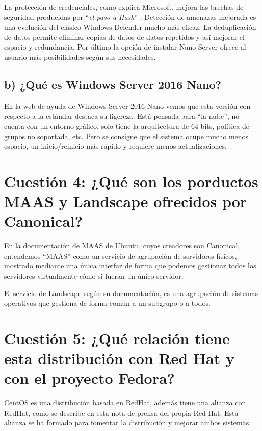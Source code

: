 La protección de credenciales, como explica Microsoft\cite{CredentialGuard}, mejora las brechas de seguridad producidas por 
 ``\textit{el paso a Hash}''	.
Detección de amenazas mejorada es una evolución del clásico Windows Defender mucho más eficaz.
La deduplicación de datos permite eliminar copias de datos de datos repetidos y así mejorar el espacio y redundancia.
Por último la opción de instalar Nano Server ofrece al usuario más posibilidades según sus necesidades.

\subsection{b) ¿Qué es Windows Server 2016 Nano?}
En la web de ayuda de Windows Server 2016 Nano \cite{NanoServer} vemos que esta versión con respecto a la estándar destaca su
 ligereza. Está pensada para ``la nube'', no cuenta con un entorno gráfico, solo tiene la arquitectura de 64 bits, política de grupos
 no soportada, etc. Pero se consigue que el sistema ocupe mucho menos espacio, un inicio/reinicio más rápido y requiere menos actualizaciones. 
 


\section{Cuestión 4: ¿Qué son los porductos MAAS y Landscape ofrecidos por Canonical?}

En la documentación de MAAS\cite{MAAS} de Ubuntu, cuyos creadores son Canonical, entendemos ``MAAS'' como un servicio de agrupación
de servidores físicos, mostrado mediante una única interfaz de forma que podemos gestionar todos los servidores virtualmente cómo si 
fueran un único servidor.

El servicio de Landscape según su documentación\cite{LandScape}, es una agrupación de sistemas operativos que gestiona
de forma común a un subgrupo o a todos.




\section{Cuestión 5: ¿Qué relación tiene esta distribución con Red Hat y con el proyecto Fedora?}
CentOS es una distribución basada en RedHat, además tiene una alianza con RedHat, como se describe en esta nota de prensa \cite{CentOsRedHat} del propia Red Hat.
Esta alianza se ha formado para fomentar la distribución y mejorar ambos sistemas.

